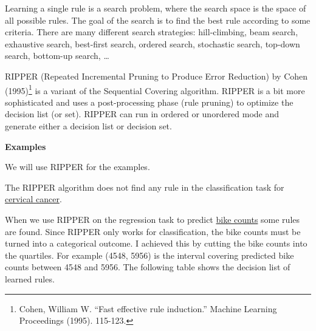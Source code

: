 \documentclass[
  10pt,
]{scrbook}
\begin{document}
Learning a single rule is a search problem, where the search space is the space of all possible rules.
The goal of the search is to find the best rule according to some criteria.
There are many different search strategies:
hill-climbing, beam search, exhaustive search, best-first search, ordered search, stochastic search, top-down search, bottom-up search, \ldots{}

RIPPER (Repeated Incremental Pruning to Produce Error Reduction) by Cohen (1995)\footnote{Cohen, William W. ``Fast effective rule induction.'' Machine Learning Proceedings (1995). 115-123.} is a variant of the Sequential Covering algorithm.
RIPPER is a bit more sophisticated and uses a post-processing phase (rule pruning) to optimize the decision list (or set).
RIPPER can run in ordered or unordered mode and generate either a decision list or decision set.

\textbf{Examples}

We will use RIPPER for the examples.

The RIPPER algorithm does not find any rule in the classification task for \protect\hyperlink{cervical}{cervical cancer}.

When we use RIPPER on the regression task to predict \protect\hyperlink{bike-data}{bike counts} some rules are found.
Since RIPPER only works for classification, the bike counts must be turned into a categorical outcome.
I achieved this by cutting the bike counts into the quartiles.
For example (4548, 5956) is the interval covering predicted bike counts between 4548 and 5956.
The following table shows the decision list of learned rules.
\end{document}

